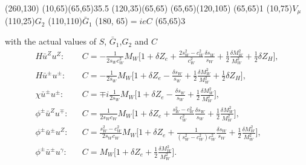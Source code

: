 \begin{axopicture}(260,130) %
	\Photon(10,65)(65,65){3}{5.5}
	(120,35)(65,65)
	(65,65)(120,105)
	\Vertex(65,65){1}		
	\Text(10,75){$V_\mu$}
	\Text(110,25){$G_2$}
	\Text(110,110){$\bar{G}_1$}
	\Text(180, 65){$=ieC$}
	\Vertex(65,65){3}
\end{axopicture}
\newline with the actual values of $S$, $\bar{G}_1$,$G_2$ and $C$
\begin{eqnarray}
H\bar{u}^Zu^Z:&&C=-\frac{1}{2s_Wc_W^2}M_W\biggl[ 1+\delta Z_e+\frac{2s_W^2-c_W^2}{c^2_W}\frac{\delta s_W}{s_W}+\frac{1}{2}\frac{\delta M^2_W}{M^2_W}+\frac{1}{2}\delta Z_H \biggr],\nonumber\\
H\bar{u}^\pm u^\pm:&&C=-\frac{1}{2s_W}M_W\biggl[ 1+\delta Z_e-\frac{\delta s_W}{s_W}+\frac{1}{2}\frac{\delta M^2_W}{M^2_W}+\frac{1}{2}\delta Z_H \biggr],\nonumber\\
\chi\bar{u}^\pm u^\pm:&&C=\mp i\frac{1}{2s_W}M_W\biggl[ 1+\delta Z_e-\frac{\delta s_W}{s_W}+\frac{1}{2}\frac{\delta M^2_W}{M^2_W} \biggr],\nonumber\\
\phi^\pm\bar{u}^Zu^\mp:&&C=\frac{1}{2s_Wc_W}M_W\biggl[ 1+\delta Z_e+\frac{s_W^2-c_W^2}{c^2_W}\frac{\delta s_W}{s_W}+\frac{1}{2}\frac{\delta M^2_W}{M^2_W} \biggr],\nonumber\\
\phi^\pm\bar{u}^\pm u^Z:&&C=\frac{s^2_W-c^2_W}{2s_Wc_W}M_W\biggl[ 1+\delta Z_e+\frac{1}{(s_W^2-c_W^2)c^2_W}\frac{\delta s_W}{s_W}+\frac{1}{2}\frac{\delta M^2_W}{M^2_W} \biggr],\nonumber\\
\phi^\pm\bar{u}^\pm u^\gamma:&&C=M_W\biggl[ 1+\delta Z_e+\frac{1}{2}\frac{\delta M^2_W}{M^2_W} \biggr].\nonumber\\
\end{eqnarray}

